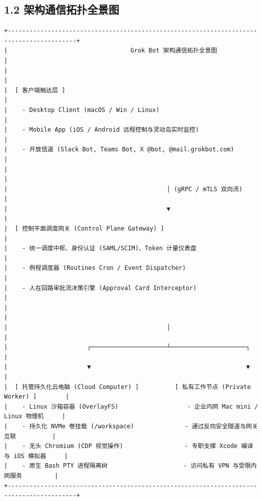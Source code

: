 \documentclass[10.5pt,a4paper,oneside]{report}
\begin{document}
\subsection{1.2
架构通信拓扑全景图}\label{ux67b6ux6784ux901aux4fe1ux62d3ux6251ux5168ux666fux56fe}

\begin{lstlisting}
+-----------------------------------------------------------------------------------------+
|                                  Grok Bot 架构通信拓扑全景图                            |
|                                                                                         |
|  [ 客户端触达层 ]                                                                        |
|    - Desktop Client (macOS / Win / Linux)                                               |
|    - Mobile App (iOS / Android 远程控制与灵动岛实时监控)                                 |
|    - 开放信道 (Slack Bot, Teams Bot, X @bot, @mail.grokbot.com)                        |
|                                                                                         |
|                                            │ (gRPC / mTLS 双向流)                       |
|                                            ▼                                            |
|  [ 控制平面调度网关 (Control Plane Gateway) ]                                            |
|    - 统一调度中枢、身份认证 (SAML/SCIM)、Token 计量仪表盘                                |
|    - 例程调度器 (Routines Cron / Event Dispatcher)                                      |
|    - 人在回路审批流决策引擎 (Approval Card Interceptor)                                 |
|                                                                                         |
|                                            │                                            |
|                      ┌─────────────────────┴─────────────────────┐                      |
|                      ▼                                           ▼                      |
|  [ 托管持久化云电脑 (Cloud Computer) ]          [ 私有工作节点 (Private Worker) ]        |
|    - Linux 沙箱容器 (OverlayFS)                   - 企业内网 Mac mini / Linux 物理机     |
|    - 持久化 NVMe 卷挂载 (/workspace)              - 通过反向安全隧道与网关互联          |
|    - 无头 Chromium (CDP 视觉操作)                 - 专职支撑 Xcode 编译与 iOS 模拟器     |
|    - 原生 Bash PTY 进程隔离树                     - 访问私有 VPN 与受限内网服务         |
+-----------------------------------------------------------------------------------------+
\end{lstlisting}
\end{document}
